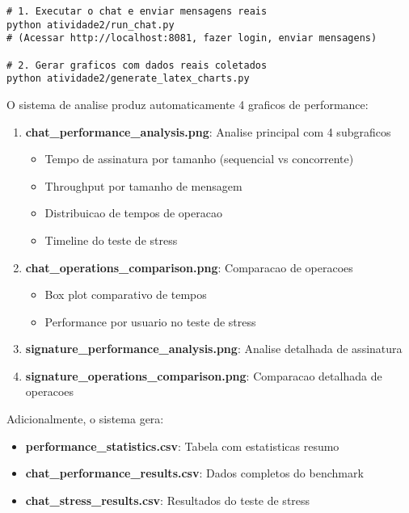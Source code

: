 \documentclass[12pt,a4paper,oneside]{article}
\begin{document}
\begin{lstlisting}[caption=Roteiro de execucao para coleta de dados reais]
# 1. Executar o chat e enviar mensagens reais
python atividade2/run_chat.py
# (Acessar http://localhost:8081, fazer login, enviar mensagens)

# 2. Gerar graficos com dados reais coletados
python atividade2/generate_latex_charts.py
\end{lstlisting}

O sistema de analise produz automaticamente 4 graficos de performance:

\begin{enumerate}
    \item \textbf{chat\_performance\_analysis.png}: Analise principal com 4 subgraficos
    \begin{itemize}
        \item Tempo de assinatura por tamanho (sequencial vs concorrente)
        \item Throughput por tamanho de mensagem
        \item Distribuicao de tempos de operacao
        \item Timeline do teste de stress
    \end{itemize}
    
    \item \textbf{chat\_operations\_comparison.png}: Comparacao de operacoes
    \begin{itemize}
        \item Box plot comparativo de tempos
        \item Performance por usuario no teste de stress
    \end{itemize}
    
    \item \textbf{signature\_performance\_analysis.png}: Analise detalhada de assinatura
    
    \item \textbf{signature\_operations\_comparison.png}: Comparacao detalhada de operacoes
\end{enumerate}

Adicionalmente, o sistema gera:
\begin{itemize}
    \item \textbf{performance\_statistics.csv}: Tabela com estatisticas resumo
    \item \textbf{chat\_performance\_results.csv}: Dados completos do benchmark
    \item \textbf{chat\_stress\_results.csv}: Resultados do teste de stress
\end{itemize}
\end{document}

